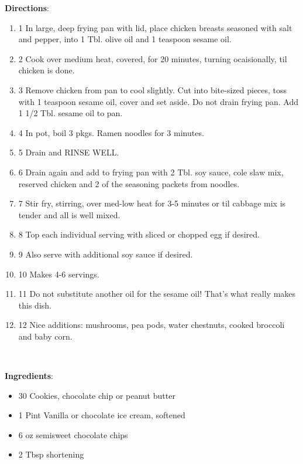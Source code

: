 \documentclass[11pt, twoside, openany]{book}
\begin{document}
\textbf{Directions}:
\vspace{-3mm}\begin{enumerate}\setlength\itemsep{-1mm}
\item 1 In large, deep frying pan with lid, place chicken breasts seasoned with salt and pepper, into 1 Tbl. olive oil and 1 teaspoon sesame oil.
\item 2 Cook over medium heat, covered, for 20 minutes, turning ocaisionally, til chicken is done.
\item 3 Remove chicken from pan to cool slightly. Cut into bite-sized pieces, toss with 1 teaspoon sesame oil, cover and set aside. Do not drain frying pan. Add 1 1/2 Tbl. sesame oil to pan.
\item 4 In pot, boil 3 pkgs. Ramen noodles for 3 minutes.
\item 5 Drain and RINSE WELL.
\item 6 Drain again and add to frying pan with 2 Tbl. soy sauce, cole slaw mix, reserved chicken and 2 of the seasoning packets from noodles.
\item 7 Stir fry, stirring, over med-low heat for 3-5 minutes or til cabbage mix is tender and all is well mixed.
\item 8 Top each individual serving with sliced or chopped egg if desired.
\item 9 Also serve with additional soy sauce if desired.
\item 10 Makes 4-6 servings.
\item 11 Do not substitute another oil for the sesame oil! That's what really makes this dish.
\item 12 Nice additions: mushrooms, pea pods, water chestnuts, cooked broccoli and baby corn.
\end{enumerate}
 \label{ice-cream-sandwiches}\hfill\textit{}\\
\begin{minipage}[t]{0.8\linewidth}
\textbf{Ingredients}:\vspace{-3mm}
\begin{multicols}{2}
\begin{itemize}\setlength\itemsep{-1mm}
\item 30 Cookies, chocolate chip or peanut butter
\item 1 Pint Vanilla or chocolate ice cream, softened
\item 6 oz semisweet chocolate chips
\item 2 Tbsp shortening
\end{itemize}
\end{multicols}
\end{minipage}
\end{document}
